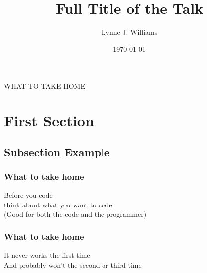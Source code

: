 \documentclass{beamer}
\title[Short title]{Full Title of the Talk} %
\author{Lynne J. Williams} %
\institute[SWC] %
{
Software Carpentry \\ %
\medskip
\textit{info@software-carpentry.org} %
}
\date{\today} %
\begin{document}
\begin{frame}
\centering
\textcolor{swcblue}{\Huge WHAT TO TAKE HOME}
\end{frame}



\section{First Section} %

\subsection{Subsection Example} %

\begin{frame}
\frametitle{What to take home}
\centering
{\huge Before you  code}\\\pause
{\Large think about what you want to code}\\\pause
{\large (Good for both the code and the programmer)}
\end{frame}

\begin{frame}
\frametitle{What to take home}
\centering
{\huge It never works the first time}\\\pause
{\large And probably won’t the second or third time}
\end{frame}
\end{document}
